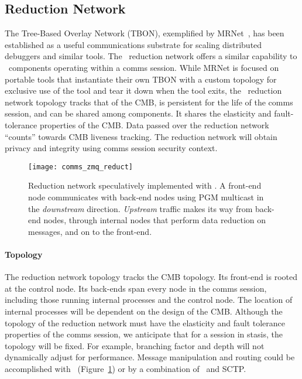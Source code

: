 \subsection{Reduction Network}

The Tree-Based Overlay Network (TBON), exemplified by MRNet~\cite{MRNet},
has been established as a useful communications substrate for scaling
distributed debuggers and similar tools.
The \ngrm\ reduction network offers a similar capability to \ngrm\ components
operating within a comms session.
While MRNet is focused on portable tools that instantiate their own TBON
with a custom topology for exclusive use of the tool and tear it down when
the tool exits,
the \ngrm\ reduction network topology tracks that of the CMB,
is persistent for the life of the comms session,
and can be shared among components.
It shares the elasticity and fault-tolerance properties of the CMB.
Data passed over the reduction network ``counts'' towards CMB liveness
tracking.
The reduction network will obtain privacy and integrity using comms
session security context.

\begin{figure}
\centering
\texttt{[image: comms\_zmq\_reduct]}
\caption{Reduction network speculatively implemented with \zMQ.
A front-end node communicates with back-end nodes using PGM multicast
in the {\em downstream} direction.  {\em Upstream} traffic makes its
way from back-end nodes, through internal nodes that perform data 
reduction on messages, and on to the front-end.}
\label{FigZmqTBON}
\end{figure}

\paragraph{Topology}
The reduction network topology tracks the CMB topology.
Its front-end is rooted at the control node.
Its back-ends span every node in the comms session, including those
running internal processes and the control node.
The location of internal processes will be dependent on the design of
the CMB.
Although the topology of the reduction network must have the elasticity
and fault tolerance properties of the comms session,
we anticipate that for a session in stasis, the topology will be fixed.
For example, branching factor and depth will not dynamically adjust for
performance.
Message manipulation and routing could be accomplished with
\zMQ\ (Figure~\ref{FigZmqTBON}) or by a combination of \zMQ\ and SCTP.

